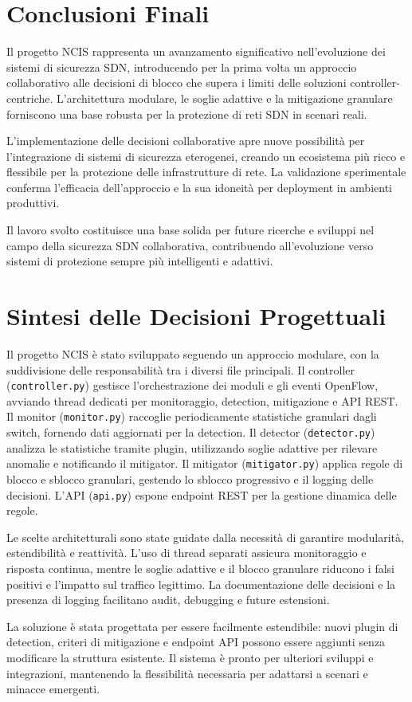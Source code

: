 \section{Conclusioni Finali}

Il progetto NCIS rappresenta un avanzamento significativo nell'evoluzione dei sistemi di sicurezza SDN, introducendo per la prima volta un approccio collaborativo alle decisioni di blocco che supera i limiti delle soluzioni controller-centriche. L'architettura modulare, le soglie adattive e la mitigazione granulare forniscono una base robusta per la protezione di reti SDN in scenari reali.\par
L'implementazione delle decisioni collaborative apre nuove possibilità per l'integrazione di sistemi di sicurezza eterogenei, creando un ecosistema più ricco e flessibile per la protezione delle infrastrutture di rete. La validazione sperimentale conferma l'efficacia dell'approccio e la sua idoneità per deployment in ambienti produttivi.\par
Il lavoro svolto costituisce una base solida per future ricerche e sviluppi nel campo della sicurezza SDN collaborativa, contribuendo all'evoluzione verso sistemi di protezione sempre più intelligenti e adattivi.

\section{Sintesi delle Decisioni Progettuali}

Il progetto NCIS è stato sviluppato seguendo un approccio modulare, con la suddivisione delle responsabilità tra i diversi file principali. Il controller (\texttt{controller.py}) gestisce l’orchestrazione dei moduli e gli eventi OpenFlow, avviando thread dedicati per monitoraggio, detection, mitigazione e API REST. Il monitor (\texttt{monitor.py}) raccoglie periodicamente statistiche granulari dagli switch, fornendo dati aggiornati per la detection. Il detector (\texttt{detector.py}) analizza le statistiche tramite plugin, utilizzando soglie adattive per rilevare anomalie e notificando il mitigator. Il mitigator (\texttt{mitigator.py}) applica regole di blocco e sblocco granulari, gestendo lo sblocco progressivo e il logging delle decisioni. L’API (\texttt{api.py}) espone endpoint REST per la gestione dinamica delle regole.

Le scelte architetturali sono state guidate dalla necessità di garantire modularità, estendibilità e reattività. L’uso di thread separati assicura monitoraggio e risposta continua, mentre le soglie adattive e il blocco granulare riducono i falsi positivi e l’impatto sul traffico legittimo. La documentazione delle decisioni e la presenza di logging facilitano audit, debugging e future estensioni.

La soluzione è stata progettata per essere facilmente estendibile: nuovi plugin di detection, criteri di mitigazione e endpoint API possono essere aggiunti senza modificare la struttura esistente. Il sistema è pronto per ulteriori sviluppi e integrazioni, mantenendo la flessibilità necessaria per adattarsi a scenari e minacce emergenti.
